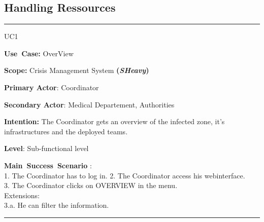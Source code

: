 \subsection{Handling Ressources}
\vspace{0.5cm}
\hrule
\vspace{0.5cm}
\begin{lyxlist}{UC1}
\small{
\item [\textbf{Use~Case:}] OverView
\item [\textbf{Scope:}] Crisis Management System \textbf{(\emph{SHeavy})}
\item [\textbf{Primary Actor}:] Coordinator
\item [\textbf{Secondary Actor}:] Medical Departement, Authorities
\item [\textbf{Intention:}] The Coordinator gets an overview of the infected
zone, it's infrastructures and the deployed teams.
\item [\textbf{Level}:]Sub-functional level
\item [\textbf{Main~Success~Scenario}]:\\
1. The Coordinator has to log in.
2. The Coordinator access his webinterface.\\
3. The Coordinator clicks on OVERVIEW in the menu.\\
Extensions:\\
	3.a. He can filter the information.\\
}
\end{lyxlist}
\hrule
\vspace{0.5cm} 

